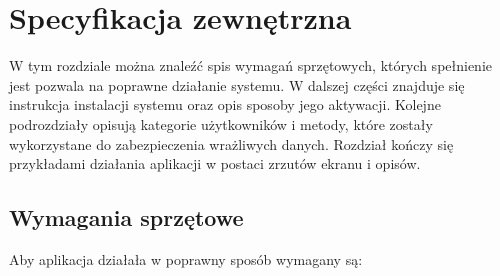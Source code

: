\documentclass[a4paper,twoside,12pt]{book}
\begin{document}
\chapter{Specyfikacja zewnętrzna}
W tym rozdziale można znaleźć spis wymagań sprzętowych, których spełnienie jest pozwala na poprawne działanie systemu. W dalszej części znajduje się instrukcja instalacji systemu oraz opis sposoby jego aktywacji. Kolejne podrozdziały opisują kategorie użytkowników i metody, które zostały wykorzystane do zabezpieczenia wrażliwych danych. Rozdział kończy się przykładami działania aplikacji w postaci zrzutów ekranu i opisów.

\section {Wymagania sprzętowe}
Aby aplikacja działała w poprawny sposób wymagany są:
\end{document}
